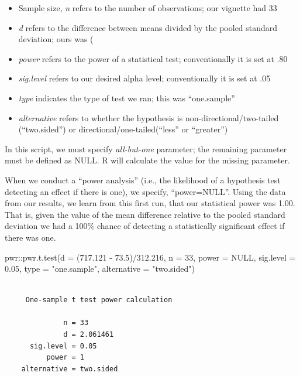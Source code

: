 \documentclass[
  11pt,
]{book}
\newenvironment{Shaded}{\begin{snugshade}}{\end{snugshade}}
\newcommand{\AttributeTok}[1]{\textcolor[rgb]{0.77,0.63,0.00}{#1}}
\newcommand{\ConstantTok}[1]{\textcolor[rgb]{0.00,0.00,0.00}{#1}}
\newcommand{\DecValTok}[1]{\textcolor[rgb]{0.00,0.00,0.81}{#1}}
\newcommand{\FloatTok}[1]{\textcolor[rgb]{0.00,0.00,0.81}{#1}}
\newcommand{\FunctionTok}[1]{\textcolor[rgb]{0.00,0.00,0.00}{#1}}
\newcommand{\NormalTok}[1]{#1}
\newcommand{\SpecialCharTok}[1]{\textcolor[rgb]{0.00,0.00,0.00}{#1}}
\newcommand{\StringTok}[1]{\textcolor[rgb]{0.31,0.60,0.02}{#1}}
\providecommand{\tightlist}{%
  \setlength{\itemsep}{0pt}\setlength{\parskip}{0pt}}
\begin{document}
\begin{itemize}
\tightlist
\item
  Sample size, \emph{n} refers to the number of observations; our vignette had 33
\item
  \emph{d} refers to the difference between means divided by the pooled standard deviation; ours was (
\item
  \emph{power} refers to the power of a statistical test; conventionally it is set at .80
\item
  \emph{sig.level} refers to our desired alpha level; conventionally it is set at .05
\item
  \emph{type} indicates the type of test we ran; this was ``one.sample''
\item
  \emph{alternative} refers to whether the hypothesis is non-directional/two-tailed (``two.sided'') or directional/one-tailed(``less'' or ``greater'')
\end{itemize}

In this script, we must specify \emph{all-but-one} parameter; the remaining parameter must be defined as NULL. R will calculate the value for the missing parameter.

When we conduct a ``power analysis'' (i.e., the likelihood of a hypothesis test detecting an effect if there is one), we specify, ``power=NULL''. Using the data from our results, we learn from this first run, that our statistical power was 1.00. That is, given the value of the mean difference relative to the pooled standard deviation we had a 100\% chance of detecting a statistically significant effect if there was one.

\begin{Shaded}
\begin{Highlighting}[]
\NormalTok{pwr}\SpecialCharTok{::}\FunctionTok{pwr.t.test}\NormalTok{(}\AttributeTok{d =}\NormalTok{ (}\FloatTok{717.121} \SpecialCharTok{{-}} \FloatTok{73.5}\NormalTok{)}\SpecialCharTok{/}\FloatTok{312.216}\NormalTok{, }\AttributeTok{n =} \DecValTok{33}\NormalTok{, }\AttributeTok{power =} \ConstantTok{NULL}\NormalTok{, }\AttributeTok{sig.level =} \FloatTok{0.05}\NormalTok{,}
    \AttributeTok{type =} \StringTok{"one.sample"}\NormalTok{, }\AttributeTok{alternative =} \StringTok{"two.sided"}\NormalTok{)}
\end{Highlighting}
\end{Shaded}

\begin{verbatim}

     One-sample t test power calculation 

              n = 33
              d = 2.061461
      sig.level = 0.05
          power = 1
    alternative = two.sided
\end{verbatim}
\end{document}
